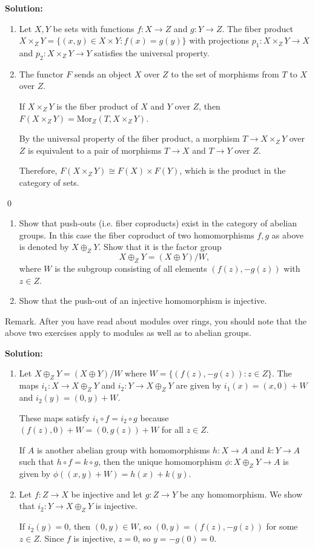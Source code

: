 \noindent\textbf{Solution:}
\begin{enumerate}[label=(\alph*)]
\item Let $X, Y$ be sets with functions $f: X \to Z$ and $g: Y \to Z$. The fiber product $X \times_Z Y = \{(x, y) \in X \times Y : f(x) = g(y)\}$ with projections $p_1: X \times_Z Y \to X$ and $p_2: X \times_Z Y \to Y$ satisfies the universal property.

\item The functor $F$ sends an object $X$ over $Z$ to the set of morphisms from $T$ to $X$ over $Z$.

If $X \times_Z Y$ is the fiber product of $X$ and $Y$ over $Z$, then $F(X \times_Z Y) = \text{Mor}_Z(T, X \times_Z Y)$.

By the universal property of the fiber product, a morphism $T \to X \times_Z Y$ over $Z$ is equivalent to a pair of morphisms $T \to X$ and $T \to Y$ over $Z$.

Therefore, $F(X \times_Z Y) \cong F(X) \times F(Y)$, which is the product in the category of sets.
\end{enumerate}


\qed
\begin{problembox}
\begin{enumerate}[label=(\alph*)]
\item Show that push-outs (i.e. fiber coproducts) exist in the category of abelian groups. In this case the fiber coproduct of two homomorphisms $f, g$ as above is denoted by $X \oplus_Z Y$. Show that it is the factor group
\[X \oplus_Z Y = (X \oplus Y)/W,\]
where $W$ is the subgroup consisting of all elements $(f(z), -g(z))$ with $z \in Z$.
\item Show that the push-out of an injective homomorphism is injective.
\end{enumerate}
Remark. After you have read about modules over rings, you should note that the above two exercises apply to modules as well as to abelian groups.
\end{problembox}

\noindent\textbf{Solution:}
\begin{enumerate}[label=(\alph*)]
\item Let $X \oplus_Z Y = (X \oplus Y)/W$ where $W = \{(f(z), -g(z)) : z \in Z\}$. The maps $i_1: X \to X \oplus_Z Y$ and $i_2: Y \to X \oplus_Z Y$ are given by $i_1(x) = (x, 0) + W$ and $i_2(y) = (0, y) + W$.

These maps satisfy $i_1 \circ f = i_2 \circ g$ because $(f(z), 0) + W = (0, g(z)) + W$ for all $z \in Z$.

If $A$ is another abelian group with homomorphisms $h: X \to A$ and $k: Y \to A$ such that $h \circ f = k \circ g$, then the unique homomorphism $\phi: X \oplus_Z Y \to A$ is given by $\phi((x, y) + W) = h(x) + k(y)$.

\item Let $f: Z \to X$ be injective and let $g: Z \to Y$ be any homomorphism. We show that $i_2: Y \to X \oplus_Z Y$ is injective.

If $i_2(y) = 0$, then $(0, y) \in W$, so $(0, y) = (f(z), -g(z))$ for some $z \in Z$. Since $f$ is injective, $z = 0$, so $y = -g(0) = 0$.
\end{enumerate}


